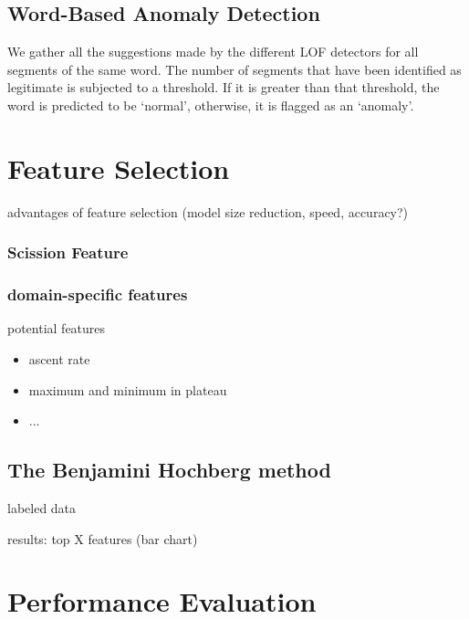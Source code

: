 \documentclass[conference]{IEEEtran}
\begin{document}
\subsection{Word-Based Anomaly Detection}
  We gather all the suggestions made by the different LOF detectors for all segments of the same word. The number of segments that have been identified as legitimate is subjected to a threshold. If it is greater than that threshold, the word is predicted to be `normal', otherwise, it is flagged as an `anomaly'.
  



\section{Feature Selection}

  \color{gray}
  advantages of feature selection (model size reduction, speed, accuracy?)
  \color{black}


\subsubsection{Scission Feature}

  \cite{kneib2018scission}

\subsubsection{domain-specific features}
  potential features
  \begin{itemize}
    \item ascent rate
    \item maximum and minimum in plateau
    \item ...
  \end{itemize}
 
 \subsection{The Benjamini Hochberg method}
 
 \cite{benjamini1995controlling}
 
  labeled data
 
  results: top X features  (bar chart)

\section{Performance Evaluation}
\end{document}
